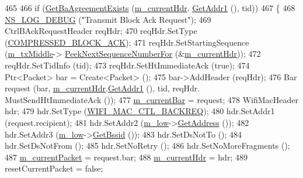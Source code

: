 \begin{DoxyCode}
465 
466           \textcolor{keywordflow}{if} (\hyperlink{classns3_1_1EdcaTxopN_abf17485d78cd742b9319cb31f658cbd2}{GetBaAgreementExists} (\hyperlink{classns3_1_1DcaTxop_ae965eb2f4d504e00526e751cd1dab3a6}{m\_currentHdr}.
      \hyperlink{classns3_1_1WifiMacHeader_a5ddcfd82e7c5a17ffea5be9246544530}{GetAddr1} (), tid))
467             \{
468               \hyperlink{group__logging_ga413f1886406d49f59a6a0a89b77b4d0a}{NS\_LOG\_DEBUG} (\textcolor{stringliteral}{"Transmit Block Ack Request"});
469               CtrlBAckRequestHeader reqHdr;
470               reqHdr.SetType (\hyperlink{namespacens3_a90f436472d19d7d7f37cbf0b8c288ff7ad325114ff6e0d84c1d4cea5bd810a48c}{COMPRESSED\_BLOCK\_ACK});
471               reqHdr.SetStartingSequence (\hyperlink{classns3_1_1DcaTxop_a605ac1de505d652e229d14a9e75c7b1a}{m\_txMiddle}->
      \hyperlink{classns3_1_1MacTxMiddle_a9ae98e7d98efae080431b7fe3b0a9a2d}{PeekNextSequenceNumberFor} (&\hyperlink{classns3_1_1DcaTxop_ae965eb2f4d504e00526e751cd1dab3a6}{m\_currentHdr}));
472               reqHdr.SetTidInfo (tid);
473               reqHdr.SetHtImmediateAck (\textcolor{keyword}{true});
474               Ptr<Packet> bar = Create<Packet> ();
475               bar->AddHeader (reqHdr);
476               Bar request (bar, \hyperlink{classns3_1_1DcaTxop_ae965eb2f4d504e00526e751cd1dab3a6}{m\_currentHdr}.\hyperlink{classns3_1_1WifiMacHeader_a5ddcfd82e7c5a17ffea5be9246544530}{GetAddr1} (), tid, reqHdr.
      MustSendHtImmediateAck ());
477               \hyperlink{classns3_1_1EdcaTxopN_a8500ea69876682da40eab4222b7066c5}{m\_currentBar} = request;
478               WifiMacHeader hdr;
479               hdr.SetType (\hyperlink{namespacens3_a9318472db39b35b2092de5c721e6ab0aa1b3c29e4b46847a71ad8f3b45c747456}{WIFI\_MAC\_CTL\_BACKREQ});
480               hdr.SetAddr1 (request.recipient);
481               hdr.SetAddr2 (\hyperlink{classns3_1_1DcaTxop_a76de11e512290acc37c9863f7ab17758}{m\_low}->\hyperlink{classns3_1_1MacLow_a109922d4f2bb1ee0b2a66aa3bcc48e2f}{GetAddress} ());
482               hdr.SetAddr3 (\hyperlink{classns3_1_1DcaTxop_a76de11e512290acc37c9863f7ab17758}{m\_low}->\hyperlink{classns3_1_1MacLow_a4d11b37c976a0bac9d123fcc4b1fb9e6}{GetBssid} ());
483               hdr.SetDsNotTo ();
484               hdr.SetDsNotFrom ();
485               hdr.SetNoRetry ();
486               hdr.SetNoMoreFragments ();
487               \hyperlink{classns3_1_1DcaTxop_a3c454c21337aac0944f86caad8b7a719}{m\_currentPacket} = request.bar;
488               \hyperlink{classns3_1_1DcaTxop_ae965eb2f4d504e00526e751cd1dab3a6}{m\_currentHdr} = hdr;
489               resetCurrentPacket = \textcolor{keyword}{false};

\end{DoxyCode}
